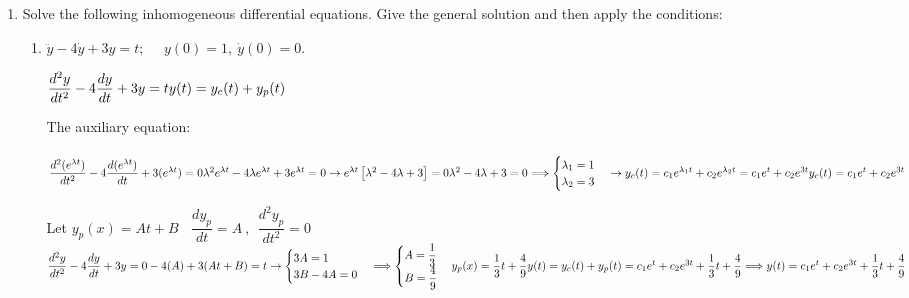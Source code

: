 \documentclass[fleqn]{article}
\begin{document}
\begin{enumerate}
    \item Solve the following inhomogeneous differential equations. Give the general solution and then apply the conditions:

      \begin{enumerate}
        \item $\ddot y-4 \dot y+3y=t; ~~~~~~ y(0)=1, ~ \dot y(0)=0.$

          \textcolor{hwColor}{
            $
              \dfrac{d^2 y}{dt^2}-4\dfrac{dy}{dt}+3y=t \\
              \\
              y(t)=y_c(t)+y_p(t) \\
            $
          }

          \textcolor{hwColor}{
            The auxiliary equation: \\
            \\
            $
              \dfrac{d^2 (e^{\lambda t})}{dt^2}-4\dfrac{d(e^{\lambda t})}{dt}+3(e^{\lambda t})=0 \\
              \\
              \lambda^2 e^{\lambda t}-4\lambda e^{\lambda t}+3e^{\lambda t}=0 \rightarrow e^{\lambda t} \left[\lambda^2-4\lambda+3\right]=0 \\
              \\
              \lambda^2-4\lambda+3=0 \Longrightarrow \begin{cases}
                \lambda_1=1 \\
                \lambda_2=3
              \end{cases} \rightarrow 
              y_c(t)=c_1e^{\lambda_1 t}+c_2e^{\lambda_2 t}=c_1e^t+c_2e^{3t} \\
              \\
              y_c(t)=c_1e^t+c_2e^{3t}
            $
          }

          \bigbreak

          \textcolor{hwColor}{
            Let $y_p(x)=At+B ~~~~ \dfrac{dy_p}{dt}=A~, ~~ \dfrac{d^2 y_p}{dt^2}=0$ \\
            $
              \dfrac{d^2 y}{dt^2}-4\dfrac{dy}{dt}+3y=0-4(A)+3(At+B)=t \rightarrow \begin{cases}
                3A=1   \\
                3B-4A=0  
              \end{cases} \Longrightarrow \begin{cases}
                A=\dfrac{1}{3} \\
                B=\dfrac{4}{9}
              \end{cases} \\
              \\
              y_p(x)=\dfrac{1}{3}t+\dfrac{4}{9} \\
              \\
              y(t)=y_c(t)+y_p(t)=c_1e^t+c_2e^{3t}+\dfrac{1}{3}t+\dfrac{4}{9} \\
              \\
              \\
              \Longrightarrow y(t)=c_1e^t+c_2e^{3t}+\dfrac{1}{3}t+\dfrac{4}{9}
            $
          }


\end{enumerate}
\end{enumerate}
\end{document}
